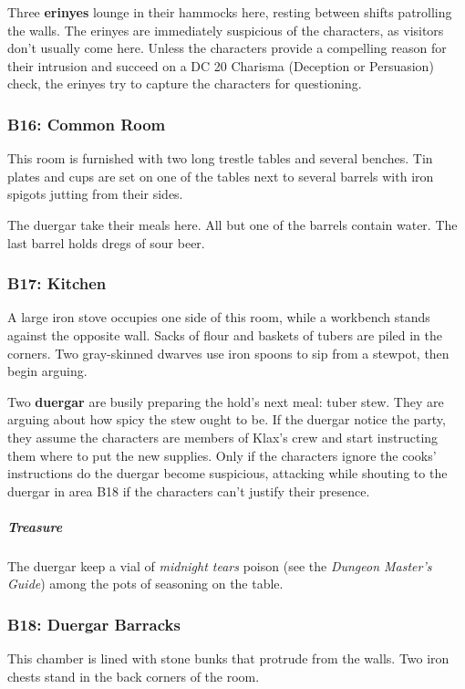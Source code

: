 \documentclass[10pt,a4paper,twoside,bg=print,twocolumn,openany,nodeprecatedcode]{dndbook}
\begin{document}
Three \textbf{erinyes} lounge in their hammocks here, resting between shifts patrolling the walls. The erinyes are immediately suspicious of the characters, as visitors don't usually come here. Unless the characters provide a compelling reason for their intrusion and succeed on a DC 20 Charisma (Deception or Persuasion) check, the erinyes try to capture the characters for questioning.

\subsubsection{B16: Common Room}
\begin{DndReadAloud}{}
This room is furnished with two long trestle tables and several benches. Tin plates and cups are set on one of the tables next to several barrels with iron spigots jutting from their sides.

\end{DndReadAloud}

The duergar take their meals here. All but one of the barrels contain water. The last barrel holds dregs of sour beer.

\subsubsection{B17: Kitchen}
\begin{DndReadAloud}{}
A large iron stove occupies one side of this room, while a workbench stands against the opposite wall. Sacks of flour and baskets of tubers are piled in the corners. Two gray-skinned dwarves use iron spoons to sip from a stewpot, then begin arguing.

\end{DndReadAloud}

Two \textbf{duergar} are busily preparing the hold's next meal: tuber stew. They are arguing about how spicy the stew ought to be. If the duergar notice the party, they assume the characters are members of Klax's crew and start instructing them where to put the new supplies. Only if the characters ignore the cooks' instructions do the duergar become suspicious, attacking while shouting to the duergar in area B18 if the characters can't justify their presence.

\subparagraph{Treasure}
The duergar keep a vial of \textit{midnight tears} poison (see the \textit{Dungeon Master's Guide}) among the pots of seasoning on the table.

\subsubsection{B18: Duergar Barracks}
\begin{DndReadAloud}{}
This chamber is lined with stone bunks that protrude from the walls. Two iron chests stand in the back corners of the room.

\end{DndReadAloud}
\end{document}
